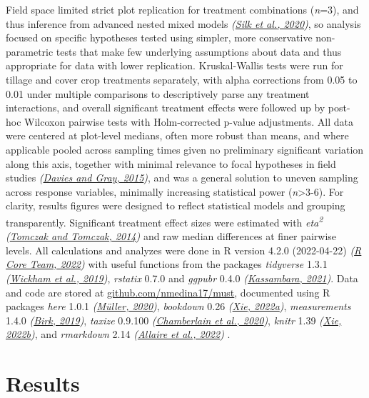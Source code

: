 \documentclass[
  12pt,
]{article}
\begin{document}
Field space limited strict plot replication for treatment combinations (\emph{n}=3), and thus inference from advanced nested mixed models \emph{(\protect\hyperlink{ref-silk20}{Silk et al., 2020})}, so analysis focused on specific hypotheses tested using simpler, more conservative non-parametric tests that make few underlying assumptions about data and thus appropriate for data with lower replication.
Kruskal-Wallis tests were run for tillage and cover crop treatments separately, with alpha corrections from 0.05 to 0.01 under multiple comparisons to descriptively parse any treatment interactions, and overall significant treatment effects were followed up by post-hoc Wilcoxon pairwise tests with Holm-corrected p-value adjustments.
All data were centered at plot-level medians, often more robust than means, and where applicable pooled across sampling times given no preliminary significant variation along this axis, together with minimal relevance to focal hypotheses in field studies \emph{(\protect\hyperlink{ref-davies15b}{Davies and Gray, 2015})}, and was a general solution to uneven sampling across response variables, minimally increasing statistical power (\emph{n}\textgreater3-6).
For clarity, results figures were designed to reflect statistical models and grouping transparently.
Significant treatment effect sizes were estimated with \emph{eta\textsuperscript{2}} \emph{(\protect\hyperlink{ref-tomczak14}{Tomczak and Tomczak, 2014})} and raw median differences at finer pairwise levels.
All calculations and analyzes were done in R version 4.2.0 (2022-04-22) \emph{(\protect\hyperlink{ref-base}{R Core Team, 2022})} with useful functions from the packages \emph{tidyverse} 1.3.1 \emph{(\protect\hyperlink{ref-tidyverse}{Wickham et al., 2019})}, \emph{rstatix} 0.7.0 and \emph{ggpubr} 0.4.0 \emph{(\protect\hyperlink{ref-rstatix}{Kassambara, 2021})}.
Data and code are stored at \url{github.com/nmedina17/must},
documented using R packages
\emph{here} 1.0.1 \emph{(\protect\hyperlink{ref-here}{Müller, 2020})},
\emph{bookdown} 0.26 \emph{(\protect\hyperlink{ref-bookdown2022}{Xie, 2022a})},
\emph{measurements} 1.4.0 \emph{(\protect\hyperlink{ref-measurements}{Birk, 2019})},
\emph{taxize} 0.9.100 \emph{(\protect\hyperlink{ref-taxize2020}{Chamberlain et al., 2020})},
\emph{knitr} 1.39 \emph{(\protect\hyperlink{ref-knitr2022}{Xie, 2022b})}, and
\emph{rmarkdown} 2.14 \emph{(\protect\hyperlink{ref-rmarkdown2022}{Allaire et al., 2022})}
.

\hypertarget{results}{%
\section{Results}\label{results}}
\end{document}
